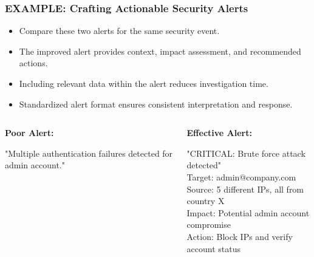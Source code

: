 \documentclass{beamer}
\begin{document}
\begin{frame}
\frametitle{EXAMPLE: Crafting Actionable Security Alerts}
\begin{itemize}
\item Compare these two alerts for the same security event.
\item The improved alert provides context, impact assessment, and recommended actions.
\item Including relevant data within the alert reduces investigation time.
\item Standardized alert format ensures consistent interpretation and response.
\end{itemize}

\scriptsize
\begin{columns}[T]
\begin{column}{0.48\textwidth}
\textbf{Poor Alert:}

"Multiple authentication failures detected for admin account."
\end{column}
\begin{column}{0.48\textwidth}
\textbf{Effective Alert:}

"CRITICAL: Brute force attack detected"\\
Target: admin@company.com\\
Source: 5 different IPs, all from country X\\
Impact: Potential admin account compromise\\
Action: Block IPs and verify account status
\end{column}
\end{columns}
\end{frame}
\end{document}
